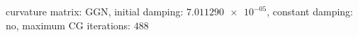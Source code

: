 curvature matrix: $\text{GGN}$, initial damping: $\num[scientific-notation=true]{7.011290e-05}$, constant damping: $\text{no}$, maximum CG iterations: $\num[scientific-notation=false]{488}$